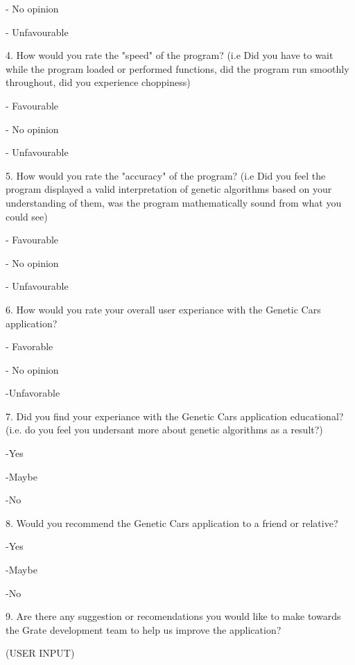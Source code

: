 \documentclass[12pt, titlepage]{article}
\begin{document}
- No opinion

- Unfavourable

4. How would you rate the "speed" of the program? (i.e Did you have to wait 
while the program loaded or performed functions, did the program run smoothly 
throughout, did you experience choppiness)

- Favourable

- No opinion

- Unfavourable

5. How would you rate the "accuracy" of the program? (i.e Did you feel the 
program displayed a valid interpretation of genetic algorithms based on your 
understanding of them, was the program mathematically sound from what you could 
see)

- Favourable

- No opinion

- Unfavourable

6. How would you rate your overall user experiance with the Genetic Cars 
application?

- Favorable

- No opinion

-Unfavorable

7. Did you find your experiance with the Genetic Cars application educational? 
(i.e. do you feel you undersant more about genetic algorithms as a result?)

-Yes

-Maybe

-No

8. Would you recommend the Genetic Cars application to a friend or relative?

-Yes

-Maybe

-No

9. Are there any suggestion or recomendations you would like to make towards the 
Grate development team to help us improve the application?

(USER INPUT)
\end{document}
